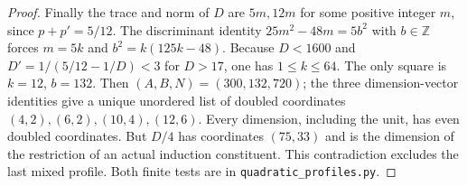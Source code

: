 \documentclass[11pt,a4paper]{article}
\numberwithin{equation}{section}
\begin{document}
\begin{proof}
Finally the trace and norm of $D$ are $5m,12m$ for some positive
integer $m$, since $p+p'=5/12$. The discriminant identity
$25m^2-48m=5b^2$ with $b\in\mathbb Z$ forces $m=5k$ and
$b^2=k(125k-48)$. Because $D<1600$ and
$D'=1/(5/12-1/D)<3$ for $D>17$, one has $1\le k\le64$.
The only square is $k=12$, $b=132$. Then $(A,B,N)=(300,132,720)$;
the three dimension-vector identities give a unique unordered list of
doubled coordinates $(4,2),(6,2),(10,4),(12,6)$. Every dimension,
including the unit, has even doubled coordinates. But $D/4$ has
coordinates $(75,33)$ and is the dimension of the restriction of
an actual induction constituent. This contradiction excludes the
last mixed profile. Both finite tests are in
\texttt{quadratic\_profiles.py}.
\end{proof}
\end{document}
